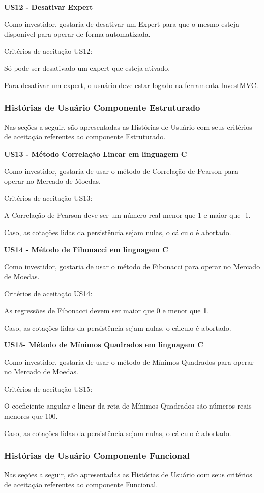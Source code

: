 \textbf{US12 - Desativar Expert}

Como investidor, gostaria de desativar um Expert para que o mesmo esteja disponível para operar de forma automatizada.

Critérios de aceitação US12:

Só pode ser desativado um expert que esteja ativado.

Para desativar um expert, o usuário deve estar logado na ferramenta InvestMVC.

\subsubsection{Histórias de Usuário Componente Estruturado}
Nas seções a seguir, são apresentadas as Histórias de Usuário com seus critérios de aceitação referentes ao componente Estruturado.

\textbf{US13 - Método Correlação Linear em linguagem C}

Como investidor, gostaria de usar o método de Correlação de Pearson para operar no Mercado de Moedas.

Critérios de aceitação US13:

A Correlação de Pearson deve ser um número real menor que 1 e maior que -1.

Caso, as cotações lidas da persistência sejam nulas, o cálculo é abortado.

\textbf{US14 - Método de Fibonacci em linguagem C}

Como investidor, gostaria de usar o método de Fibonacci para operar no Mercado de Moedas.

Critérios de aceitação US14:

As regressões de Fibonacci devem ser maior que 0 e menor que 1.

Caso, as cotações lidas da persistência sejam nulas, o cálculo é abortado.

\textbf{US15- Método de Mínimos Quadrados em linguagem C}

Como investidor, gostaria de usar o método de Mínimos Quadrados para operar no Mercado de Moedas.

Critérios de aceitação US15:

O coeficiente angular e linear da reta de Mínimos Quadrados são números reais menores que 100.

Caso, as cotações lidas da persistência sejam nulas, o cálculo é abortado.

\subsubsection{Histórias de Usuário Componente Funcional}
Nas seções a seguir, são apresentadas as Histórias de Usuário com seus critérios de aceitação referentes ao componente Funcional.

